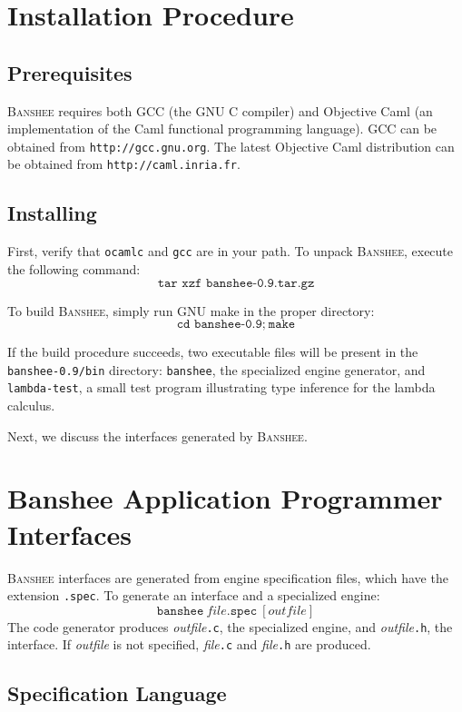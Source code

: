 \documentclass{article}
\newcommand{\banshee}{\textsc{Banshee}}
\begin{document}
\section{Installation Procedure}

\subsection{Prerequisites}
\banshee{} requires both GCC (the GNU C compiler) and Objective Caml
(an implementation of the Caml functional programming language). GCC
can be obtained from \texttt{http://gcc.gnu.org}. The latest Objective
Caml distribution can be obtained from \texttt{http://caml.inria.fr}.

\subsection{Installing}

First, verify that \texttt{ocamlc} and \texttt{gcc} are in your path. 
To unpack \banshee{}, execute the following command:
$$
\texttt{tar xzf banshee-0.9.tar.gz}
$$

To build \banshee{}, simply run GNU make in the proper directory:
$$
\texttt{cd banshee-0.9;}~\texttt{make}
$$

If the build procedure succeeds, two executable files will be present in the \texttt{banshee-0.9/bin} directory: \texttt{banshee}, the specialized engine generator, and
\texttt{lambda-test}, a small test program illustrating type inference for the lambda calculus.

Next, we discuss the interfaces generated by \banshee{}.

\section{Banshee Application Programmer Interfaces}

\banshee{} interfaces are generated from engine specification files, which 
have the extension \texttt{.spec}. To generate an interface and a specialized 
engine:
$$
\texttt{banshee}~file\texttt{.spec}~[outfile]
$$
The code generator produces \textit{outfile}\texttt{.c}, the specialized 
engine, and \textit{outfile}\texttt{.h}, the interface. If \textit{outfile} 
is not specified, \textit{file}\texttt{.c} and \textit{file}\texttt{.h} are 
produced.

\subsection{Specification Language}
\end{document}
